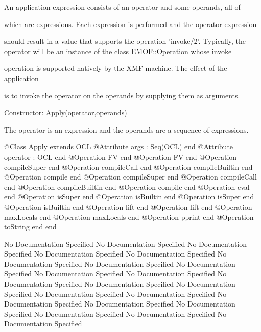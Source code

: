        An application expression consists of an operator and some operands, all of

       which are expressions. Each expression is performed and the operator expression

       should result in a value that supports the operation 'invoke/2'. Typically,
       the operator will be an instance of the class EMOF::Operation whose invoke

       operation is supported natively by the XMF machine. The effect of the application

       is to invoke the operator on the operands by supplying them as arguments.
       
     Constructor: Apply(operator,operands)
     
       The operator is an expression and the operands are a sequence of expressions.
\begin{Interface}
@Class Apply extends OCL
  @Attribute args : Seq(OCL) end
  @Attribute operator : OCL end
  @Operation FV end
  @Operation FV end
  @Operation compileSuper end
  @Operation compileCall end
  @Operation compileBuiltin end
  @Operation compile end
  @Operation compileSuper end
  @Operation compileCall end
  @Operation compileBuiltin end
  @Operation compile end
  @Operation eval end
  @Operation isSuper end
  @Operation isBuiltin end
  @Operation isSuper end
  @Operation isBuiltin end
  @Operation lift end
  @Operation lift end
  @Operation maxLocals end
  @Operation maxLocals end
  @Operation pprint end
  @Operation toString end
end
\end{Interface}
No Documentation Specified
No Documentation Specified
No Documentation Specified
No Documentation Specified
No Documentation Specified
No Documentation Specified
No Documentation Specified
No Documentation Specified
No Documentation Specified
No Documentation Specified
No Documentation Specified
No Documentation Specified
No Documentation Specified
No Documentation Specified
No Documentation Specified
No Documentation Specified
No Documentation Specified
No Documentation Specified
No Documentation Specified
No Documentation Specified
No Documentation Specified

